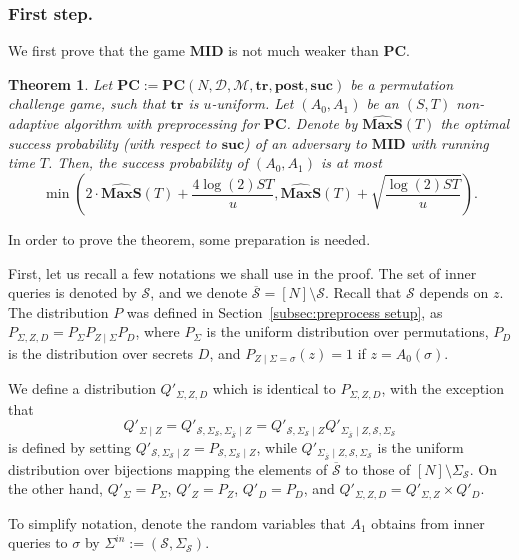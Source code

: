 \documentclass[11pt]{article}
\newtheorem{theorem}{Theorem}[section]
\newcommand{\SECS}{{\mathcal{D}}}
\newcommand{\SECV}{{D}}
\newcommand{\SUC}{\boldsymbol{suc}}
\newcommand{\TR}{\boldsymbol{tr}}
\newcommand{\POST}{\boldsymbol{post}}
\newcommand{\PC}{\boldsymbol{PC}}
\newcommand{\MID}{\boldsymbol{MID}}
\newcommand{\MAXS}{\boldsymbol{MaxS}}
\begin{document}
\subsubsection{First step.}
We first prove that the game $\MID$ is not much weaker than $\PC$.
\begin{theorem} \label{thm:pc to middle}
Let $\PC := \PC(N,\SECS,\mathcal{M},\TR,\POST,\SUC)$ be a permutation challenge game, such that 
$\TR$ is $u$-uniform.
Let $(A_0,A_1)$ be an $(S,T)$ non-adaptive algorithm with preprocessing for $\PC$.
Denote by $\widehat{\MAXS}(T)$ the optimal success probability (with respect to $\SUC$) of an adversary to $\MID$ with running time $T$.
Then, the success probability of $(A_0,A_1)$ is at most
\[
\min \left(2\cdot \widehat{\MAXS}(T) + \frac{4\log(2) S T }{u}, \widehat{\MAXS}(T) + 
\sqrt{\frac{\log(2) ST} {{u}}}\right).
\]
\end{theorem}

In order to prove the theorem, some preparation is needed.

\medskip 

First, let us recall a few notations we shall use in the proof. The set of inner queries is denoted by $\mathcal{S}$, and we denote $\overline{\mathcal{S}} = [N] \setminus \mathcal{S}$.  Recall that $\mathcal{S}$ depends on $z$.
The distribution $P$ was defined in Section~\ref{subsec:preprocess setup}, as $P_{\Sigma,Z,\SECV} = P_{\Sigma} P_{Z \mid \Sigma} P_\SECV$, where $P_\Sigma$ is the uniform distribution over permutations, $P_\SECV$ is the distribution over secrets $\SECV$, and $P_{Z \mid \Sigma = \sigma}(z) = 1$ if 
$z = A_0(\sigma)$.


We define a distribution $Q'_{\Sigma,Z,\SECV}$ which is identical to $P_{\Sigma,Z,\SECV}$,
with the exception that 
$$
Q'_{\Sigma \mid Z} 
= 
Q'_{\mathcal{S},\Sigma_{\mathcal{S}}, \Sigma_{\overline{\mathcal{S}}} \mid Z} 
=
Q'_{\mathcal{S},\Sigma_{\mathcal{S}} \mid Z} Q'_{\Sigma_{\overline{\mathcal{S}}} \mid Z, \mathcal{S},\Sigma_{\mathcal{S}} }
$$ 
is defined by setting
$Q'_{\mathcal{S},\Sigma_{\mathcal{S}} \mid Z} = P_{\mathcal{S},\Sigma_{\mathcal{S}} \mid Z}$,
while 
$Q'_{\Sigma_{\overline{\mathcal{S}}} \mid Z, \mathcal{S},\Sigma_{\mathcal{S}} }$
is the uniform distribution over bijections mapping the elements of $\overline{\mathcal{S}}$ to those of $[N] \setminus \Sigma_{\mathcal{S}}$.
On the other hand, $Q'_{\Sigma} = P_{\Sigma}$, $Q'_{Z} = P_{Z}$, $Q'_{\SECV} = P_{\SECV}$, and 
$Q'_{\Sigma,Z,\SECV} = Q'_{\Sigma,Z} \times Q'_\SECV$. 


To simplify notation, 
denote the random variables that $A_1$ obtains from inner queries to $\sigma$
by 
$\Sigma^{in} := (\mathcal{S},\Sigma_{\mathcal{S}})$.
\end{document}
